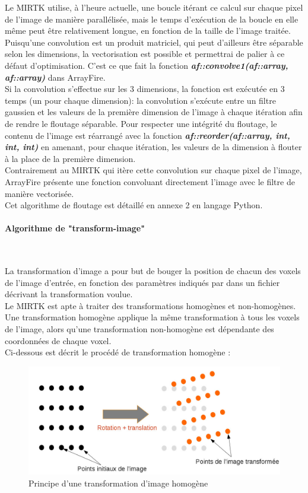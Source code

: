 \documentclass[10pt]{report}
\begin{document}
	Le MIRTK utilise, à l'heure actuelle, une boucle itérant ce calcul sur chaque pixel de l'image de manière parallélisée, mais le temps d'exécution de la boucle en elle même peut être relativement longue, en fonction de la taille de l'image traitée. 
	Puisqu'une convolution est un produit matriciel, qui peut d'ailleurs être séparable selon les dimensions, la vectorisation est possible et permettrai de palier à ce défaut d'optimisation. C'est ce que fait la fonction \textbf{\textit{af::convolve1(af::array, af::array)}} dans ArrayFire.\\
	Si la convolution s'effectue sur les 3 dimensions, la fonction est exécutée en 3 temps (un pour chaque dimension): la convolution s'exécute entre un filtre gaussien et les valeurs de la première dimension de l'image à chaque itération afin de rendre le floutage séparable. Pour respecter une intégrité du floutage, le contenu de l'image est réarrangé avec la fonction \textbf{\textit{af::reorder(af::array, int, int, int)}} en amenant, pour chaque itération, les valeurs de la dimension à flouter à la place de la première dimension.\\ 
	Contrairement au MIRTK qui itère cette convolution sur chaque pixel de l'image, ArrayFire présente une fonction convoluant directement l'image avec le filtre de manière vectorisée.\\
	Cet algorithme de floutage est détaillé en annexe 2 en langage Python.
	\paragraph{Algorithme de "transform-image"} ~\par
	La transformation d'image a pour but de bouger la position de chacun des voxels de l'image d'entrée, en fonction des paramètres indiqués par dans un fichier décrivant la transformation voulue.\\
	Le MIRTK est apte à traiter des transformations homogènes et non-homogènes. Une transformation homogène applique la même transformation à tous les voxels de l'image, alors qu'une transformation non-homogène est dépendante des coordonnées de chaque voxel.  \\
	Ci-dessous est décrit le procédé de transformation homogène :
	\begin{figure}[h!]
		\begin{center}
			\includegraphics[width=14cm]{transform_trans_rot.jpg}
		\end{center}
		\caption{Principe d'une transformation d'image homogène}
		\label{Principe d'une transformation d'image homogène}
	\end{figure} ~\par
	
\end{document}

